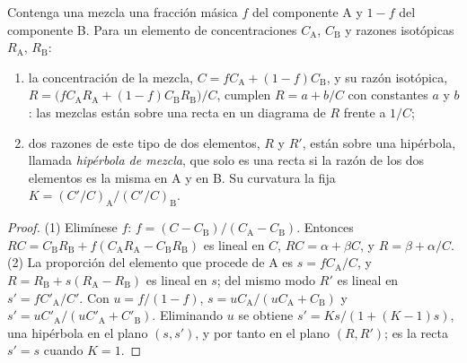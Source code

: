 \begin{proposition}\label{prop:b2:isotope-geochemistry:mixing}
Contenga una mezcla una fracción másica $f$ del componente A y $1-f$ del componente
B. Para un elemento de concentraciones $C_{\mathrm A}$, $C_{\mathrm B}$ y razones
isotópicas $R_{\mathrm A}$, $R_{\mathrm B}$:
\begin{enumerate}
\item la concentración de la mezcla, $C = fC_{\mathrm A} + (1-f)C_{\mathrm B}$, y
su razón isotópica,
$R = \bigl(fC_{\mathrm A}R_{\mathrm A} + (1-f)C_{\mathrm B}R_{\mathrm B}\bigr)/C$, cumplen
$R = a + b/C$ con constantes $a$ y $b$: las mezclas están sobre una recta en
un diagrama de $R$ frente a $1/C$;
\item dos razones de este tipo de dos elementos, $R$ y $R'$, están sobre una hipérbola, llamada
\emph{hipérbola de mezcla}, que solo es una recta
si la razón de los dos elementos es la misma en A y en B. Su curvatura la fija
$K = (C'/C)_{\mathrm A}/(C'/C)_{\mathrm B}$.
\end{enumerate}
\end{proposition}

\begin{proof}
(1) Elimínese $f$: $f = (C - C_{\mathrm B})/(C_{\mathrm A} - C_{\mathrm B})$. Entonces
$RC = C_{\mathrm B}R_{\mathrm B} + f(C_{\mathrm A}R_{\mathrm A} - C_{\mathrm B}R_{\mathrm
B})$ es lineal en $C$, $RC = \alpha + \beta C$, y $R = \beta + \alpha/C$.
(2) La proporción del elemento que procede de A es $s = fC_{\mathrm A}/C$, y $R =
R_{\mathrm B} + s(R_{\mathrm A} - R_{\mathrm B})$ es lineal en $s$; del mismo modo $R'$ es
lineal en $s' = fC'_{\mathrm A}/C'$. Con $u = f/(1-f)$, $s = u C_{\mathrm
A}/(uC_{\mathrm A} + C_{\mathrm B})$ y $s' = uC'_{\mathrm A}/(uC'_{\mathrm A} +
C'_{\mathrm B})$. Eliminando $u$ se obtiene $s' = Ks/(1 + (K-1)s)$, una hipérbola en el
plano $(s, s')$, y por tanto en el plano $(R, R')$; es la recta $s' = s$
cuando $K = 1$.
\end{proof}

